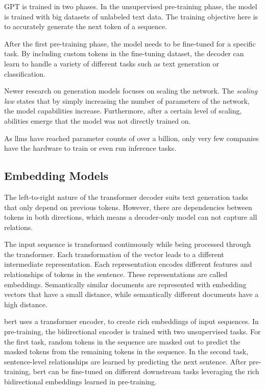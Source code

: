\documentclass[../main.tex]{subfiles}
\begin{document}
GPT is trained in two phases.
In the unsupervised pre-training phase,
the model is trained with big datasets of unlabeled text data.
The training objective here is
to accurately generate the next token of a sequence.

After the first pre-training phase,
the model needs to be fine-tuned for a specific task.
By including custom tokens in the fine-tuning dataset,
the decoder can learn to handle a variety of different tasks
such as text generation or classification.

Newer research on generation models focuses on scaling the network.
The \emph{scaling law} states
that by simply increasing the number of parameters of the network,
the model capabilities increase.
Furthermore,
after a certain level of scaling,
abilities emerge that the model was not directly trained on.

As \glspl{llm} have reached parameter counts of over a billion,
only very few companies have the hardware to train or even run inference tasks.

\subsection{Embedding Models}
\label{subsec:embedding}

The left-to-right nature of the transformer decoder suits text generation tasks that only depend on previous tokens.
However, there are dependencies between tokens in both directions,
which means a decoder-only model can not capture all relations.

The input sequence is transformed continuously while being processed through the transformer.
Each transformation of the vector leads to a different intermediate representation.
Each representation encodes different features and relationships of tokens in the sentence.
These representations are called embeddings.
Semantically similar documents are represented with embedding vectors that have a small distance,
while semantically different documents have a high distance.

\Gls{bert} \cite{Devlin2019} uses a transformer encoder,
to create rich embeddings of input sequences.
In pre-training, the bidirectional encoder is trained with two unsupervised tasks.
For the first task,
random tokens in the sequence are masked out to predict the masked tokens from the remaining tokens in the sequence.
In the second task, sentence-level relationships are learned by predicting the next sentence.
After pre-training,  \gls{bert}  can be fine-tuned on different downstream tasks
leveraging the rich bidirectional embeddings learned in pre-training.
\end{document}
